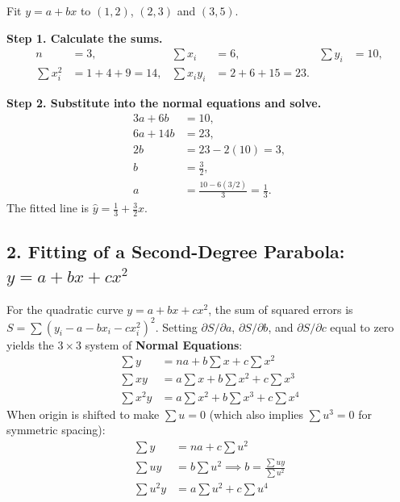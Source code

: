 \documentclass[12pt,a4paper]{article}
\begin{document}
\begin{tcolorbox}[examplebox, title={\textbf{Worked Example: Fitting a Straight Line}}]
Fit $y=a+bx$ to $(1,2)$, $(2,3)$ and $(3,5)$.

\textbf{Step 1. Calculate the sums.}
\[
  \begin{aligned}
    n&=3, & \sum x_i&=6, & \sum y_i&=10,\\
    \sum x_i^2&=1+4+9=14, &
    \sum x_i y_i&=2+6+15=23.
  \end{aligned}
\]

\textbf{Step 2. Substitute into the normal equations and solve.}
\[
  \begin{aligned}
    3a+6b &= 10,\\
    6a+14b &= 23,\\
    2b &= 23-2(10)=3,\\
    b &= \frac{3}{2},\\
    a &= \frac{10-6(3/2)}{3}=\frac{1}{3}.
  \end{aligned}
\]
The fitted line is $\widehat{y}=\frac{1}{3}+\frac{3}{2}x$.
\end{tcolorbox}

\subsection{2. Fitting of a Second-Degree Parabola: $y = a + bx + cx^2$}
\begin{tcolorbox}[formulabox, title={\textbf{Normal Equations for a Second-Degree Parabola}}]
For the quadratic curve $y = a + bx + cx^2$, the sum of squared errors is $S = \sum (y_i - a - bx_i - cx_i^2)^2$.
Setting $\partial S/\partial a$, $\partial S/\partial b$, and $\partial S/\partial c$ equal to zero yields the $3 \times 3$ system of \textbf{Normal Equations}:
\begin{align}
  \sum y &= n a + b \sum x + c \sum x^2 \\[4pt]
  \sum x y &= a \sum x + b \sum x^2 + c \sum x^3 \\[4pt]
  \sum x^2 y &= a \sum x^2 + b \sum x^3 + c \sum x^4
\end{align}
When origin is shifted to make $\sum u = 0$ (which also implies $\sum u^3 = 0$ for symmetric spacing):
\begin{align}
  \sum y &= n a + c \sum u^2 \\[2pt]
  \sum u y &= b \sum u^2 \implies b = \frac{\sum u y}{\sum u^2} \\[2pt]
  \sum u^2 y &= a \sum u^2 + c \sum u^4
\end{align}
\end{tcolorbox}
\end{document}
